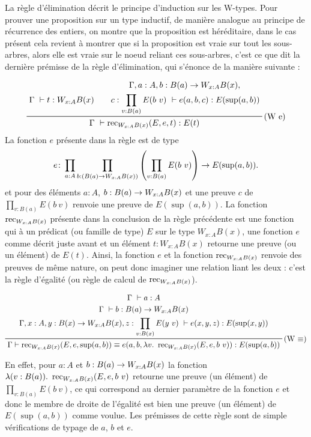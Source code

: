 \documentclass[../../rapport.tex]{subfiles}
\begin{document}
  La règle d'élimination décrit le principe d'induction sur les W-types.
  Pour prouver une proposition sur un type inductif, de manière analogue au principe de récurrence des entiers,
  on montre que la proposition est héréditaire, dans le cas présent cela revient à montrer que si la proposition est vraie
  sur tout les sous-arbres, alors elle est vraie sur le noeud reliant ces sous-arbres, c'est ce que dit la dernière prémisse
  de la règle d'élimination, qui s'énonce de la manière suivante :

  $$
  \prfinterspace=2em
  \prftree[r]{(W e)}
  {\Gamma\ \vdash t : W_{x:A}B(x)}
  {
    \prfStackPremises
    {\Gamma, a : A, b : B(a) \fun W_{x:A}B(x),}
    {c : \prod_{v:B(a)}{E(b\ v)}\ \vdash e(a, b, c) : E(\sup(a, b))}
  }
  {\Gamma\ \vdash \rec_{W_{x:A}B(x)}(E, e, t) : E(t)}
  $$
  La fonction $e$ présente dans la règle est de type
  $$e \colon \prod_{a:A}\prod_{b:(B(a) \rightarrow W_{x:A}B(x))}\left(\prod_{v:B(a)}E(b\ v)\right) \rightarrow E(\sup(a, b)).$$
  et pour des éléments $a : A$, $b : B(a) \rightarrow W_{x:A}B(x)$ et une preuve $c$ de $\prod_{v:B(a)}{E(b\ v)}$
  renvoie une preuve de $E(\sup(a, b))$.
  La fonction $\operatorname{rec}_{W_{x:A}B(x)}$ présente dans la conclusion de la règle précédente est une fonction qui à un prédicat
  (ou famille de type) $E$ sur le type $W_{x:A}B(x)$, une fonction $e$ comme décrit juste avant et un élément $t : W_{x:A}B(x)$
  retourne une preuve (ou un élément) de $E(t)$. Ainsi, la fonction $e$ et la fonction $\operatorname{rec}_{W_{x:A}B(x)}$ renvoie des preuves de même nature,
  on peut donc imaginer une relation liant les deux : c'est la règle d'égalité (ou règle de calcul de $\operatorname{rec}_{W_{x:A}B(x)}$).

  $$
  \prfinterspace=2em
  \prftree[r]{(W $\equiv$)}
    {\prfStackPremises
      {\Gamma\ \vdash a : A}
      {\Gamma\ \vdash b : B(a) \fun W_{x:A}B(x)}
      {\Gamma, x : A, y : B(x) \fun W_{x:A}B(x), z : \prod_{v:B(x)}{E(y\ v)}\ \vdash e(x, y, z) : E(\sup(x, y))}
    }
      {\Gamma \vdash \rec_{W_{x:A}B(x)}(E, e, \sup(a, b)) \equiv e(a, b, \lambda v.\ \rec_{W_{x:A}B(x)}(E, e, b\ v)) : E(\sup(a, b))}
  $$

  En effet, pour $a : A$ et $b : B(a) \rightarrow W_{x:A}B(x)$ la fonction $\lambda(v : B(a)).\ \operatorname{rec}_{W_{x:A}B(x)}(E, e, b\ v)$
  retourne une preuve (un élément) de $\prod_{v : B(a)}{E(b \ v)}$, ce qui correspond au
  dernier paramètre de la fonction $e$ et donc le membre de droite de l'égalité est bien une preuve (un élément)
  de $E(\sup(a, b))$ comme voulue.
  Les prémisses de cette règle sont de simple vérifications de typage de $a$, $b$ et $e$.
\end{document}
